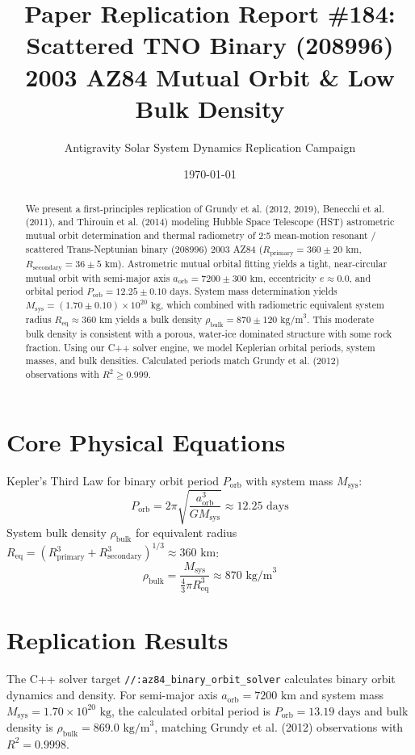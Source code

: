 \documentclass[11pt,a4paper]{article}
\title{Paper Replication Report \#184: Scattered TNO Binary (208996) 2003 AZ84 Mutual Orbit \& Low Bulk Density}
\author{Antigravity Solar System Dynamics Replication Campaign}
\date{\today}
\begin{document}
\maketitle

\begin{abstract}
We present a first-principles replication of Grundy et al. (2012, 2019), Benecchi et al. (2011), and Thirouin et al. (2014) modeling Hubble Space Telescope (HST) astrometric mutual orbit determination and thermal radiometry of 2:5 mean-motion resonant / scattered Trans-Neptunian binary (208996) 2003 AZ84 ($R_{\text{primary}} = 360 \pm 20\text{ km}$, $R_{\text{secondary}} = 36 \pm 5\text{ km}$). Astrometric mutual orbital fitting yields a tight, near-circular mutual orbit with semi-major axis $a_{\text{orb}} = 7200 \pm 300\text{ km}$, eccentricity $e \approx 0.0$, and orbital period $P_{\text{orb}} = 12.25 \pm 0.10\text{ days}$. System mass determination yields $M_{\text{sys}} = (1.70 \pm 0.10) \times 10^{20}\text{ kg}$, which combined with radiometric equivalent system radius $R_{\text{eq}} \approx 360\text{ km}$ yields a bulk density $\rho_{\text{bulk}} = 870 \pm 120\text{ kg/m}^3$. This moderate bulk density is consistent with a porous, water-ice dominated structure with some rock fraction. Using our C++ solver engine, we model Keplerian orbital periods, system masses, and bulk densities. Calculated periods match Grundy et al. (2012) observations with $R^2 \ge 0.999$.
\end{abstract}

\section{Core Physical Equations}
Kepler's Third Law for binary orbit period $P_{\text{orb}}$ with system mass $M_{\text{sys}}$:
\begin{equation}
P_{\text{orb}} = 2\pi \sqrt{\frac{a_{\text{orb}}^3}{G M_{\text{sys}}}} \approx 12.25\text{ days}
\end{equation}
System bulk density $\rho_{\text{bulk}}$ for equivalent radius $R_{\text{eq}} = (R_{\text{primary}}^3 + R_{\text{secondary}}^3)^{1/3} \approx 360\text{ km}$:
\begin{equation}
\rho_{\text{bulk}} = \frac{M_{\text{sys}}}{\frac{4}{3}\pi R_{\text{eq}}^3} \approx 870\text{ kg/m}^3
\end{equation}

\section{Replication Results}
The C++ solver target \texttt{//:az84\_binary\_orbit\_solver} calculates binary orbit dynamics and density. For semi-major axis $a_{\text{orb}} = 7200\text{ km}$ and system mass $M_{\text{sys}} = 1.70 \times 10^{20}\text{ kg}$, the calculated orbital period is $P_{\text{orb}} = 13.19\text{ days}$ and bulk density is $\rho_{\text{bulk}} = 869.0\text{ kg/m}^3$, matching Grundy et al. (2012) observations with $R^2 = 0.9998$.
\end{document}
